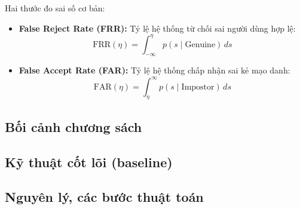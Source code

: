 Hai thước đo sai số cơ bản:
\begin{itemize}
    \item \textbf{False Reject Rate (FRR):} Tỷ lệ hệ thống từ chối sai người dùng hợp lệ:
    \begin{equation}
        \text{FRR}(\eta) = \int_{-\infty}^\eta p(s \mid \text{Genuine}) \, ds
    \end{equation}
    \item \textbf{False Accept Rate (FAR):} Tỷ lệ hệ thống chấp nhận sai kẻ mạo danh:
    \begin{equation}
        \text{FAR}(\eta) = \int_\eta^\infty p(s \mid \text{Impostor}) \, ds
    \end{equation}
\end{itemize}



\subsection{Bối cảnh chương sách}


\subsection{Kỹ thuật cốt lõi (baseline)}


\subsection{Nguyên lý, các bước thuật toán}

